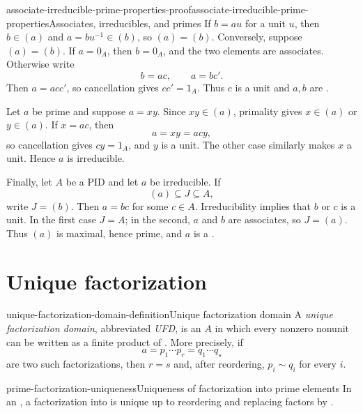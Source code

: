 \documentclass[preview]{standalone}
\begin{document}
\begin{snippetproof}{associate-irreducible-prime-properties-proof}{associate-irreducible-prime-properties}{Associates, irreducibles, and primes}
    If \(b=au\) for a unit \(u\), then \(b\in(a)\) and
    \(a=bu^{-1}\in(b)\), so \((a)=(b)\). Conversely, suppose
    \((a)=(b)\). If \(a=0_A\), then \(b=0_A\), and the two elements are
    associates. Otherwise write
    \[
        b=ac,
        \qquad
        a=bc'.
    \]
    Then \(a=acc'\), so cancellation gives \(cc'=1_A\). Thus \(c\) is a
    unit and \(a,b\) are \associateelements.

    Let \(a\) be prime and suppose \(a=xy\). Since \(xy\in(a)\),
    primality gives \(x\in(a)\) or \(y\in(a)\). If \(x=ac\), then
    \[
        a=xy=acy,
    \]
    so cancellation gives \(cy=1_A\), and \(y\) is a unit. The other case
    similarly makes \(x\) a unit. Hence \(a\) is irreducible.

    Finally, let \(A\) be a PID and let \(a\) be irreducible. If
    \[
        (a)\subseteq J\subseteq A,
    \]
    write \(J=(b)\). Then \(a=bc\) for some \(c\in A\). Irreducibility
    implies that \(b\) or \(c\) is a unit. In the first case \(J=A\); in
    the second, \(a\) and \(b\) are associates, so \(J=(a)\). Thus
    \((a)\) is maximal, hence prime, and \(a\) is a \primeelement.
\end{snippetproof}

\section{Unique factorization}

\begin{snippetdefinition}{unique-factorization-domain-definition}{Unique factorization domain}
    A \emph{unique factorization domain}, abbreviated \emph{UFD}, is an
    \integraldomain \(A\) in which every nonzero nonunit can be written as
    a finite product of . More precisely, if
    \[
        a=p_1\cdots p_r=q_1\cdots q_s
    \]
    are two such factorizations, then \(r=s\) and, after reordering,
    \(p_i\sim q_i\) for every \(i\).
\end{snippetdefinition}

\begin{snippetproposition}{prime-factorization-uniqueness}{Uniqueness of factorization into prime elements}
    In an \integraldomain, a factorization into
     is unique up to reordering and replacing
    factors by \associateelements.
\end{snippetproposition}
\end{document}
